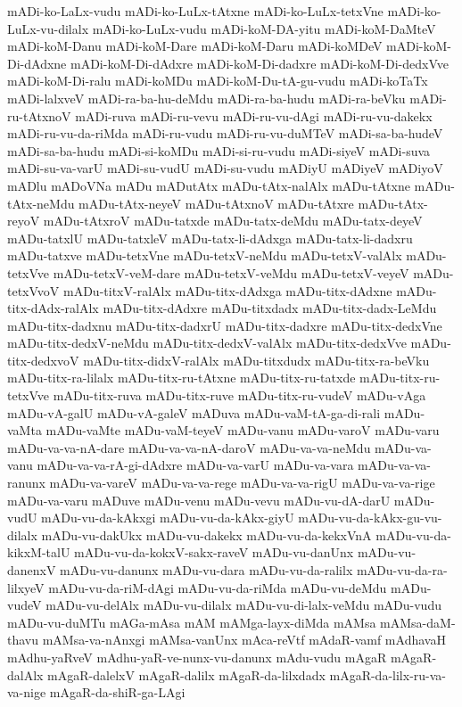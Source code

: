 {mADi-ko-LaLx-vudu
mADi-ko-LuLx-tAtxne
mADi-ko-LuLx-tetxVne
mADi-ko-LuLx-vu-dilalx
mADi-ko-LuLx-vudu
mADi-koM-DA-yitu
mADi-koM-DaMteV
mADi-koM-Danu
mADi-koM-Dare
mADi-koM-Daru
mADi-koMDeV
mADi-koM-Di-dAdxne
mADi-koM-Di-dAdxre
mADi-koM-Di-dadxre
mADi-koM-Di-dedxVve
mADi-koM-Di-ralu
mADi-koMDu
mADi-koM-Du-tA-gu-vudu
mADi-koTaTx
mADi-lalxveV
mADi-ra-ba-hu-deMdu
mADi-ra-ba-hudu
mADi-ra-beVku
mADi-ru-tAtxnoV
mADi-ruva
mADi-ru-vevu
mADi-ru-vu-dAgi
mADi-ru-vu-dakekx
mADi-ru-vu-da-riMda
mADi-ru-vudu
mADi-ru-vu-duMTeV
mADi-sa-ba-hudeV
mADi-sa-ba-hudu
mADi-si-koMDu
mADi-si-ru-vudu
mADi-siyeV
mADi-suva
mADi-su-va-varU
mADi-su-vudU
mADi-su-vudu
mADiyU
mADiyeV
mADiyoV
mADlu
mADoVNa
mADu
mADutAtx
mADu-tAtx-nalAlx
mADu-tAtxne
mADu-tAtx-neMdu
mADu-tAtx-neyeV
mADu-tAtxnoV
mADu-tAtxre
mADu-tAtx-reyoV
mADu-tAtxroV
mADu-tatxde
mADu-tatx-deMdu
mADu-tatx-deyeV
mADu-tatxlU
mADu-tatxleV
mADu-tatx-li-dAdxga
mADu-tatx-li-dadxru
mADu-tatxve
mADu-tetxVne
mADu-tetxV-neMdu
mADu-tetxV-valAlx
mADu-tetxVve
mADu-tetxV-veM-dare
mADu-tetxV-veMdu
mADu-tetxV-veyeV
mADu-tetxVvoV
mADu-titxV-ralAlx
mADu-titx-dAdxga
mADu-titx-dAdxne
mADu-titx-dAdx-ralAlx
mADu-titx-dAdxre
mADu-titxdadx
mADu-titx-dadx-LeMdu
mADu-titx-dadxnu
mADu-titx-dadxrU
mADu-titx-dadxre
mADu-titx-dedxVne
mADu-titx-dedxV-neMdu
mADu-titx-dedxV-valAlx
mADu-titx-dedxVve
mADu-titx-dedxvoV
mADu-titx-didxV-ralAlx
mADu-titxdudx
mADu-titx-ra-beVku
mADu-titx-ra-lilalx
mADu-titx-ru-tAtxne
mADu-titx-ru-tatxde
mADu-titx-ru-tetxVve
mADu-titx-ruva
mADu-titx-ruve
mADu-titx-ru-vudeV
mADu-vAga
mADu-vA-galU
mADu-vA-galeV
mADuva
mADu-vaM-tA-ga-di-rali
mADu-vaMta
mADu-vaMte
mADu-vaM-teyeV
mADu-vanu
mADu-varoV
mADu-varu
mADu-va-va-nA-dare
mADu-va-va-nA-daroV
mADu-va-va-neMdu
mADu-va-vanu
mADu-va-va-rA-gi-dAdxre
mADu-va-varU
mADu-va-vara
mADu-va-va-ranunx
mADu-va-vareV
mADu-va-va-rege
mADu-va-va-rigU
mADu-va-va-rige
mADu-va-varu
mADuve
mADu-venu
mADu-vevu
mADu-vu-dA-darU
mADu-vudU
mADu-vu-da-kAkxgi
mADu-vu-da-kAkx-giyU
mADu-vu-da-kAkx-gu-vu-dilalx
mADu-vu-dakUkx
mADu-vu-dakekx
mADu-vu-da-kekxVnA
mADu-vu-da-kikxM-talU
mADu-vu-da-kokxV-sakx-raveV
mADu-vu-danUnx
mADu-vu-danenxV
mADu-vu-danunx
mADu-vu-dara
mADu-vu-da-ralilx
mADu-vu-da-ra-lilxyeV
mADu-vu-da-riM-dAgi
mADu-vu-da-riMda
mADu-vu-deMdu
mADu-vudeV
mADu-vu-delAlx
mADu-vu-dilalx
mADu-vu-di-lalx-veMdu
mADu-vudu
mADu-vu-duMTu
mAGa-mAsa
mAM
mAMga-layx-diMda
mAMsa
mAMsa-daM-thavu
mAMsa-va-nAnxgi
mAMsa-vanUnx
mAca-reVtf
mAdaR-vamf
mAdhavaH
mAdhu-yaRveV
mAdhu-yaR-ve-nunx-vu-danunx
mAdu-vudu
mAgaR
mAgaR-dalAlx
mAgaR-dalelxV
mAgaR-dalilx
mAgaR-da-lilxdadx
mAgaR-da-lilx-ru-va-va-nige
mAgaR-da-shiR-ga-LAgi
}
